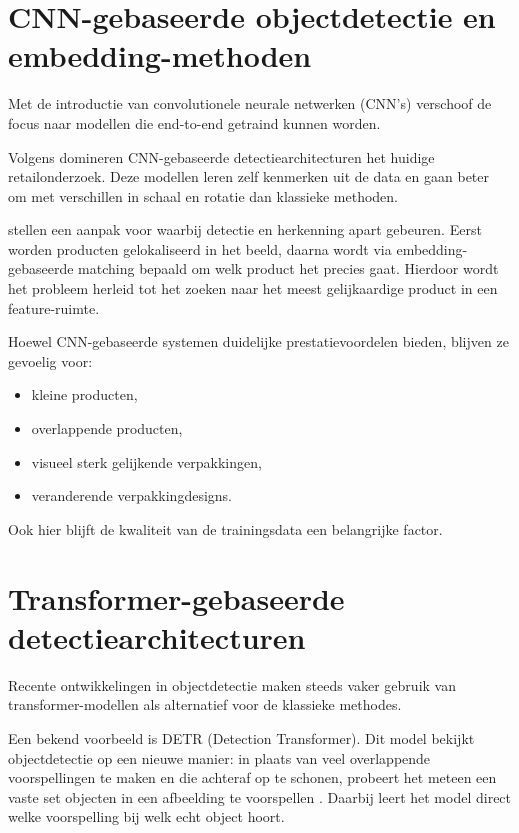 \section{CNN-gebaseerde objectdetectie en embedding-methoden}

Met de introductie van convolutionele neurale netwerken (CNN’s) verschoof de focus naar modellen die end-to-end getraind kunnen worden.

Volgens \textcite{MELEK2024108452} domineren CNN-gebaseerde detectiearchitecturen het huidige retailonderzoek. Deze modellen leren zelf kenmerken uit de data en gaan beter om met verschillen in schaal en rotatie dan klassieke methoden.

\textcite{TONIONI201810733} stellen een aanpak voor waarbij detectie en herkenning apart gebeuren. Eerst worden producten gelokaliseerd in het beeld, daarna wordt via embedding-gebaseerde matching bepaald om welk product het precies gaat. Hierdoor wordt het probleem herleid tot het zoeken naar het meest gelijkaardige product in een feature-ruimte.

Hoewel CNN-gebaseerde systemen duidelijke prestatievoordelen bieden, blijven ze gevoelig voor:

\begin{itemize}
\item kleine producten,
\item overlappende producten,
\item visueel sterk gelijkende verpakkingen,
\item veranderende verpakkingdesigns.
\end{itemize}

Ook hier blijft de kwaliteit van de trainingsdata een belangrijke factor.

\section{Transformer-gebaseerde detectiearchitecturen}

Recente ontwikkelingen in objectdetectie maken steeds vaker gebruik van transformer-modellen als alternatief voor de klassieke methodes.

Een bekend voorbeeld is DETR (Detection Transformer). Dit model bekijkt objectdetectie op een nieuwe manier: in plaats van veel overlappende voorspellingen te maken en die achteraf op te schonen, probeert het meteen een vaste set objecten in een afbeelding te voorspellen \autocite{carion2020}. Daarbij leert het model direct welke voorspelling bij welk echt object hoort.

